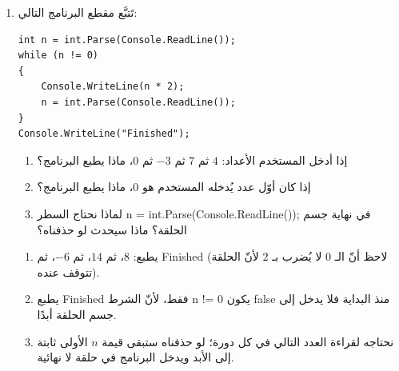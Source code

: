 \documentclass[14pt]{extarticle}
\begin{document}
\begin{enumerate}[itemsep=2em]
\item تَتبَّع مقطع البرنامج التالي:
\begin{boxCode}
\begin{english}
\begin{verbatim}
int n = int.Parse(Console.ReadLine());
while (n != 0)
{
    Console.WriteLine(n * 2);
    n = int.Parse(Console.ReadLine());
}
Console.WriteLine("Finished");
\end{verbatim}
\end{english}
\end{boxCode}
\begin{enumerate}
    \item إذا أدخل المستخدم الأعداد: $4$ ثم $7$ ثم $-3$ ثم $0$، ماذا يطبع البرنامج؟
    \item إذا كان أوّل عدد يُدخله المستخدم هو $0$، ماذا يطبع البرنامج؟
    \item لماذا نحتاج السطر \textenglish{n = int.Parse(Console.ReadLine());} في نهاية جسم الحلقة؟ ماذا سيحدث لو حذفناه؟
\end{enumerate}
\ifwithsols
\begin{boxSolution}
\begin{enumerate}
    \item يطبع: $8$، ثم $14$، ثم $-6$، ثم \textenglish{Finished} (لاحظ أنّ الـ $0$ لا يُضرب بـ $2$ لأنّ الحلقة تتوقف عنده).
    \item يطبع \textenglish{Finished} فقط، لأنّ الشرط \textenglish{n != 0} يكون \textenglish{false} منذ البداية فلا يدخل إلى جسم الحلقة أبدًا.
    \item نحتاجه لقراءة العدد التالي في كل دورة؛ لو حذفناه ستبقى قيمة $n$ الأولى ثابتة إلى الأبد ويدخل البرنامج في حلقة لا نهائية.
\end{enumerate}
\end{boxSolution}
\fi
\filbreak


\end{enumerate}
\end{document}
